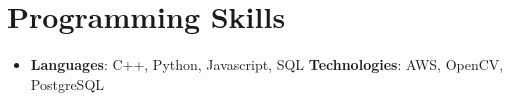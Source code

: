 \documentclass[letterpaper,11pt]{article}
\newcommand{\resumeSubHeadingListStart}{\begin{itemize}[leftmargin=*]}
\newcommand{\resumeSubHeadingListEnd}{\end{itemize}}
\begin{document}
%
\section{Programming Skills}
 \resumeSubHeadingListStart
   \item{
     \textbf{Languages}{: C++, Python, Javascript, SQL}
     \hfill
     \textbf{Technologies}{:  AWS, OpenCV, PostgreSQL}
   }
 \resumeSubHeadingListEnd


\end{document}
